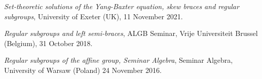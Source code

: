 \documentclass[margin,line]{res}
\begin{document}
\begin{resume}
{\vspace{-0.1in}
\emph{Set-theoretic solutions of the Yang-Baxter equation, skew braces and regular subgroups}, University of Exeter (UK), 11 November 2021.

\vspace{-0.1in}
\emph{Regular subgroups and left semi-braces}, ALGB Seminar, Vrije Universiteit Brussel (Belgium),  31 October 2018.

\vspace{-0.1in}
\emph{Regular subgroups of the affine group, Seminar Algebra},  Seminar Algebra, University of Warsaw (Poland) 24 November 2016.


\vspace{-0.1in}


%

%
%


}
\end{resume}
\end{document}

